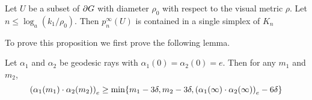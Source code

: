 \documentclass[a4paper]{article}
\begin{document}
\begin{proposition}\label{prop:projectstoasimplex}
  Let $U$ be a subset of $\boundary G$ with diameter $\rho_0$ with respect to
  the visual metric $\rho$. Let $n \leq \log_a(k_1/\rho_0)$. Then
  $p^\infty_n(U)$ is contained in a single simplex of $K_n$
\end{proposition}

To prove this proposition we first prove the following lemma.

\begin{lemma}\label{lem:boundary_gromov_product}
  Let $\alpha_1$ and $\alpha_2$ be geodesic rays with $\alpha_1(0) =
  \alpha_2(0) = e$. Then for any $m_1$ and $m_2$,
  \begin{equation*}
    \gromov{e}{\alpha_1(m_1)}{\alpha_2(m_2)} \geq 
        \min\{m_1 - 3\delta, m_2 - 3\delta, \gromov{e}{\alpha_1(\infty)}{\alpha_2(\infty)} - 6\delta\}
  \end{equation*}
\end{lemma}
\end{document}
